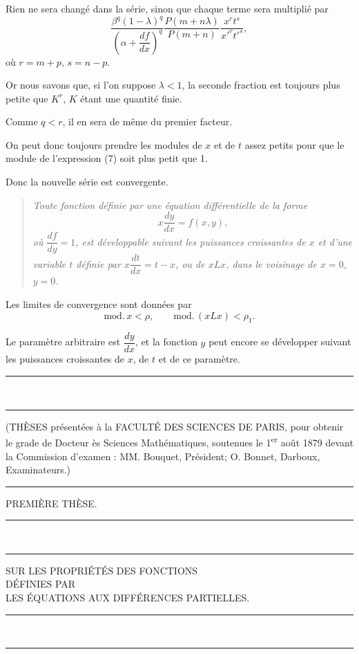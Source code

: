 \documentclass[11pt]{article}
\newcommand{\ornament}{\begin{center}\rule{2.5em}{0.4pt}\,\raisebox{0.1ex}{\tiny$\bullet\bullet\bullet$}\,\rule{2.5em}{0.4pt}\end{center}}
\newcommand{\shortline}{\begin{center}\rule{3.5em}{0.4pt}\end{center}}
\begin{document}
Rien ne sera changé dans la série, sinon que chaque terme sera multiplié par
\begin{equation*}\tag{7}
\frac{\beta^q(1-\lambda)^q}{\left(\alpha+\dfrac{df}{dx}\right)^q}\frac{P(m+n\lambda)}{P(m+n)}\frac{x^r t^s}{x'^r t'^s},
\end{equation*}
où $r=m+p$, $s=n-p$.

Or nous savons que, si l’on suppose $\lambda<1$, la seconde fraction est toujours plus petite que $K^r$, $K$ étant une quantité finie.

Comme $q<r$, il en sera de même du premier facteur.

On peut donc toujours prendre les modules de $x$ et de $t$ assez petits pour que le module de l’expression (7) soit plus petit que 1.

Donc la nouvelle série est convergente.

\begin{quote}\itshape
Toute fonction définie par une équation différentielle de la forme
\[
x\frac{dy}{dx}=f(x,y),
\]
où $\dfrac{df}{dy}=1$, est développable suivant les puissances croissantes de $x$ et d’une variable $t$ définie par $x\dfrac{dt}{dx}=t-x$, ou de $xLx$, dans le voisinage de $x=0$, $y=0$.
\end{quote}

Les limites de convergence sont données par
\[
\mathrm{mod}.\,x<\rho,
\qquad
\mathrm{mod}.\,(xLx)<\rho_1.
\]

Le paramètre arbitraire est $\dfrac{dy}{dx}$, et la fonction $y$ peut encore se développer suivant les puissances croissantes de $x$, de $t$ et de ce paramètre.

\ornament

\clearpage
\begin{center}
(THÈSES présentées à la FACULTÉ DES SCIENCES DE PARIS, pour obtenir le grade de Docteur ès Sciences Mathématiques, soutenues le 1\textsuperscript{er} août 1879 devant la Commission d'examen : MM. Bouquet, Président; O. Bonnet, Darboux, Examinateurs.)
\end{center}
\shortline

\begin{center}
{\large PREMIÈRE THÈSE.}
\end{center}
\ornament

\begin{center}
{\Large SUR LES PROPRIÉTÉS DES FONCTIONS}\\[0.5em]
{\small DÉFINIES PAR}\\[0.5em]
{\large LES ÉQUATIONS AUX DIFFÉRENCES PARTIELLES.}
\end{center}
\ornament
\end{document}
